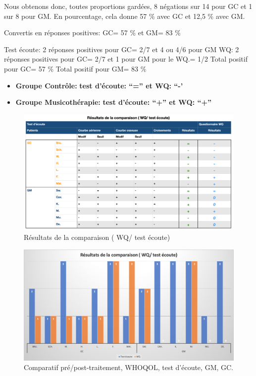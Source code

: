 Nous obtenons donc, toutes proportions gardées, 8 négations sur 14 pour GC et
1 sur 8 pour GM. En pourcentage, cela donne 57  \% avec GC et 12,5  \% avec GM.

Convertis en réponses positives: GC= 57 \%   et GM= 83  \%


Test écoute: 2 réponses positives pour GC= 2/7  et        4  ou 4/6 pour GM 
WQ:               2 réponses positives pour GC= 2/7 et 1 pour GM pour le WQ.= 1/2
Total positif pour GC= 57 \%
 Total positif pour GM= 83  \%
 \begin{itemize} 
 \item \textbf{Groupe Contrôle:} 	          \textbf{ test d'écoute: ``=''   et    WQ: ``-'}


 \item \textbf{Groupe Musicothérapie:}     \textbf{test d'écoute: ``+''      et    WQ: ``+''}
  \end{itemize}
  \begin{figure}
  	\centering
  	\includegraphics[width=\linewidth]{images/graphiques/comparaison_pre_post.png}
  	\caption[Résultats de la comparaison ( WQ/ test écoute)]{Résultats de la comparaison ( WQ/ test 
  	écoute)}
  	
  	\label{comparaison_pre_post}
  \end{figure}
  \begin{figure}
  	\centering
  	\includegraphics[width=\linewidth]{images/graphiques/comparatifWQecoute.png}
  	\caption[Comparatif résultats pré/post]{Comparatif
  		pré/post-traitement, WHOQOL, test d'écoute, GM, GC.}
  	
  	\label{comparaison_pre_post}
  \end{figure}
  
